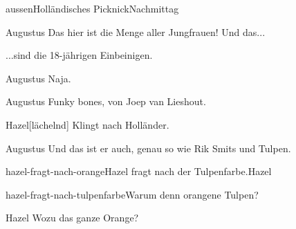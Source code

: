 \documentclass[12pt]{article}
\begin{document}
\begin{scene}{aussen}{Holländisches Picknick}{Nachmittag}

        \begin{dialog}{Augustus}
            Das hier ist die Menge aller Jungfrauen!
            Und das...


            ...sind die 18-jährigen Einbeinigen.
        \end{dialog}


        \begin{dialog}{Augustus}
            Naja.
        \end{dialog}


        \begin{dialog}{Augustus}
            Funky bones, von Joep van Lieshout.
        \end{dialog}

        \begin{dialog}{Hazel}[lächelnd]
            Klingt nach Holländer.
        \end{dialog}

        \begin{dialog}{Augustus}
            Und das ist er auch, genau so wie Rik Smits und Tulpen.
        \end{dialog}


        \begin{decision}{hazel-fragt-nach-orange}{\gls{Hazel} fragt nach der Tulpenfarbe.}{Hazel}
            \begin{option}{hazel-fragt-nach-tulpenfarbe}{Warum denn orangene Tulpen?}
                \begin{dialog}{Hazel}
                    Wozu das ganze Orange?
                \end{dialog}


\end{option}
\end{decision}
\end{scene}
\end{document}
